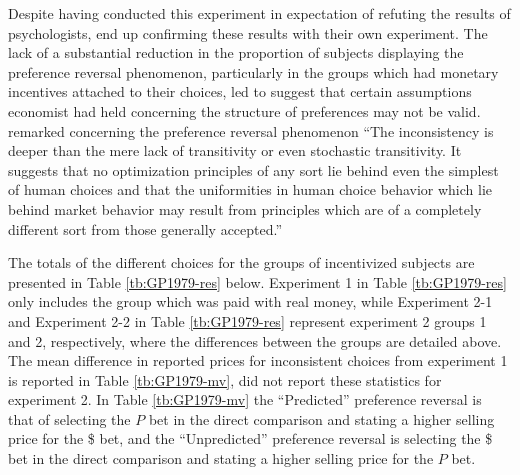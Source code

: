 \documentclass[../main.tex]{subfiles}
\begin{document}
Despite having conducted this experiment in expectation of refuting the results of psychologists, \textcite{Grether1979} end up confirming these results with their own experiment.
The lack of a substantial reduction in the proportion of subjects displaying the preference reversal phenomenon, particularly in the groups which had monetary incentives attached to their choices, led \textcite{Grether1979} to suggest that certain assumptions economist had held concerning the structure of preferences may not be valid.
\textcite[623]{Grether1979} remarked concerning the preference reversal phenomenon \enquote{The inconsistency is deeper than the mere lack of transitivity or even stochastic transitivity.
It suggests that no optimization principles of any sort lie behind even the simplest of human choices and that the uniformities in human choice behavior which lie behind market behavior may result from principles which are of a completely different sort from those generally accepted.} 

The totals of the different choices for the groups of incentivized subjects are presented in Table \ref{tb:GP1979-res} below.
Experiment 1 in Table \ref{tb:GP1979-res} only includes the group which was paid with real money, while Experiment 2-1 and Experiment 2-2 in Table \ref{tb:GP1979-res} represent experiment 2 groups 1 and 2, respectively,  where the differences between the groups are detailed above.
The mean difference in reported prices for inconsistent choices from experiment 1 is reported in Table \ref{tb:GP1979-mv}, \textcite{Grether1979} did not report these statistics for experiment 2.
In Table \ref{tb:GP1979-mv} the \enquote{Predicted} preference reversal is that of selecting the $P$ bet in the direct comparison and stating a higher selling price for the \$ bet, and the \enquote{Unpredicted} preference reversal is selecting the \$ bet in the direct comparison and stating a higher selling price for the $P$ bet.
\end{document}
